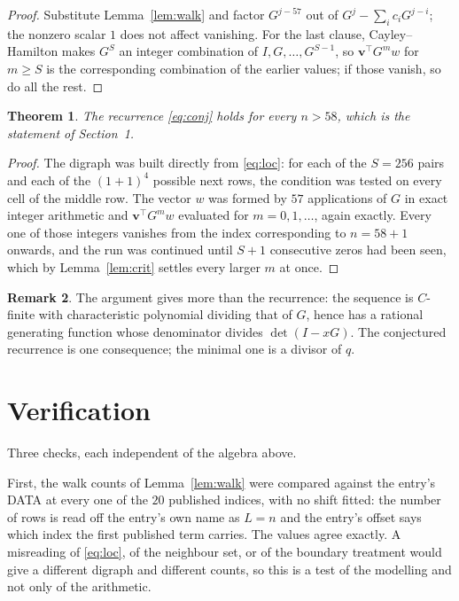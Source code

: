\documentclass[11pt,a4paper]{article}
\theoremstyle{plain}
\newtheorem{theorem}{Theorem}
\theoremstyle{definition}
\newtheorem{remark}[theorem]{Remark}
\begin{document}
\begin{proof}
Substitute Lemma~\ref{lem:walk} and factor $G^{j-57}$ out of
$G^{j}-\sum_ic_iG^{j-i}$; the nonzero scalar $1$ does not affect
vanishing. For the last clause, Cayley--Hamilton makes $G^{S}$ an integer combination of
$I,G,\dots,G^{S-1}$, so $\mathbf{v}^{\!\top}G^{m}w$ for $m\ge S$ is the corresponding
combination of the earlier values; if those vanish, so do all the rest.
\end{proof}

\begin{theorem}
The recurrence \eqref{eq:conj} holds for every $n>58$, which is the statement of
Section~1.
\end{theorem}

\begin{proof}
The digraph was built directly from \eqref{eq:loc}: for each of the $S=256$ pairs and each
of the $(1+1)^{4}$ possible next rows, the condition was tested on every cell of
the middle row. The vector $w$ was formed by $57$ applications of $G$ in exact integer
arithmetic and $\mathbf{v}^{\!\top}G^{m}w$ evaluated for $m=0,1,\dots$, again exactly.
Every one of those integers vanishes from the index corresponding to $n=58+1$ onwards,
and the run was continued until $S+1$ consecutive zeros had been seen, which by
Lemma~\ref{lem:crit} settles every larger $m$ at once.
\end{proof}

\begin{remark}
The argument gives more than the recurrence: the sequence is $C$-finite with characteristic
polynomial dividing that of $G$, hence has a rational generating function whose denominator
divides $\det(I-xG)$. The conjectured recurrence is one consequence; the minimal one is a
divisor of $q$.
\end{remark}

\section{Verification}

Three checks, each independent of the algebra above.

First, the walk counts of Lemma~\ref{lem:walk} were compared against the entry's DATA at
every one of the $20$ published indices, with no shift fitted: the number of rows is
read off the entry's own name as $L=n$ and the entry's offset says which index the first
published term carries. The values agree exactly. A misreading of \eqref{eq:loc}, of the
neighbour set, or of the boundary treatment would give a different digraph and different
counts, so this is a test of the modelling and not only of the arithmetic.
\end{document}
